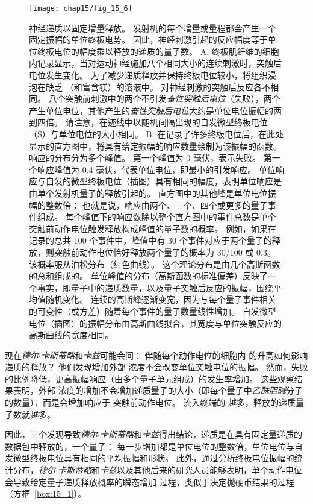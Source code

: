 \begin{figure}[htbp]
	\centering
	\texttt{[image: chap15/fig\_15\_6]}
	\caption{神经递质以固定增量释放。
		发射机的每个增量或量程都会产生一个固定振幅的单位终板电势。
		因此，神经刺激引起的反应幅度等于单位终板电位的幅度乘以释放的递质的量子数。
		A. 终板肌纤维的细胞内记录显示，当对运动神经施加八个相同大小的连续刺激时，突触后电位发生变化。
		为了减少递质释放并保持终板电位较小，将组织浸泡在缺乏 （和富含镁）的溶液中。
		对神经刺激的突触后反应各不相同。
		八个突触前刺激中的两个不引发\textit{奋性突触后电位}（失败），两个产生单位电位，其他产生的\textit{奋性突触后电位}大约是单位电位振幅的两到四倍。
		请注意，在迹线中以随机间隔出现的自发微型终板电位（S）与单位电位的大小相同\cite{liley1956quantal}。
		B. 在记录了许多终板电位后，在此处显示的直方图中，将具有给定振幅的响应数量绘制为该振幅的函数。
		响应的分布分为多个峰值。
		第一个峰值为 0 毫伏，表示失败。
		第一个响应峰值为 0.4 毫伏，代表单位电位，即最小的引发响应。
		单位响应与自发的微型终板电位（插图）具有相同的幅度，表明单位响应是由单个发射机量子的释放引起的。
		直方图中的其他峰是单位电位振幅的整数倍；
		也就是说，响应由两个、三个、四个或更多的量子事件组成。
		每个峰值下的响应数除以整个直方图中的事件总数是单个突触前动作电位触发释放构成峰值的量子数的概率。
		例如，如果在记录的总共 100 个事件中，峰值中有 30 个事件对应于两个量子的释放，则突触前动作电位恰好释放两个量子的概率为 30/100 或 0.3。
		该概率服从泊松分布（红色曲线）。
		这个理论分布是由几个高斯函数的总和组成的。
		单位峰值的分布（高斯函数的标准偏差）反映了一个事实，即量子中的递质数量，以及量子突触后反应的振幅，围绕平均值随机变化。
		连续的高斯峰逐渐变宽，因为与每个量子事件相关的可变性（或方差）随着每个事件的量子数量线性增加。
		自发微型电位（插图）的振幅分布由高斯曲线拟合，其宽度与单位突触反应的高斯曲线的宽度相同\cite{boyd1956end}。}
	\label{fig:15_6}
\end{figure}


现在\textit{德尔$\cdot$卡斯蒂略}和\textit{卡兹}可能会问：
伴随每个动作电位的细胞内  的升高如何影响递质的释放？
他们发现增加外部  浓度不会改变单位突触电位的振幅。
然而，失败的比例降低，更高振幅响应（由多个量子单元组成）的发生率增加。
这些观察结果表明，外部  浓度的增加不会增加递质量子的大小（即每个量子中\textit{乙酰胆碱}分子的数量），而是会增加响应于 突触前动作电位。
流入终端的  越多，释放的递质量子数就越多。


因此，三个发现导致\textit{德尔$\cdot$卡斯蒂略}和\textit{卡兹}得出结论，递质是在具有固定量递质的数据包中释放的，一个量子：
每一步增加都是单位电位的整数倍，单位电位与自发微型终板电位具有相同的平均振幅和形状。
此外，通过分析终板电位振幅的统计分布，\textit{德尔$\cdot$卡斯蒂略}和\textit{卡兹}以及其他后来的研究人员能够表明，单个动作电位会导致给定量子递质释放概率的瞬态增加 过程，类似于决定抛硬币结果的过程（方框~\ref{box:15_1}）。


